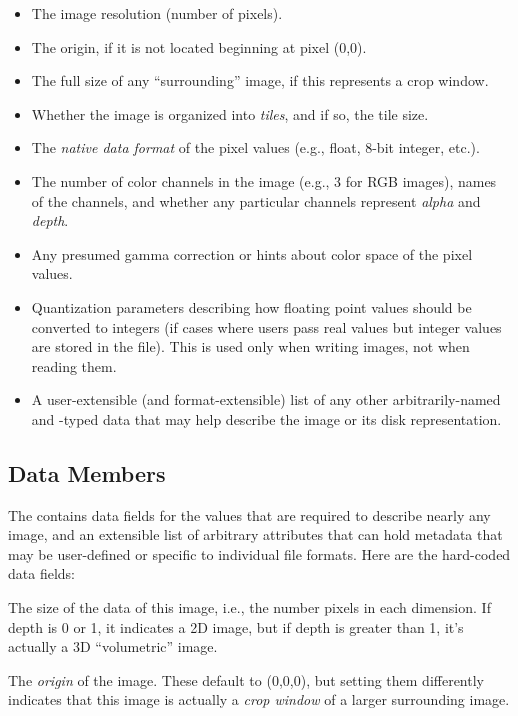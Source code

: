 \begin{itemize}
\item The image resolution (number of pixels).
\item The origin, if it is not located beginning at pixel (0,0).
\item The full size of any ``surrounding'' image, if this represents a crop
  window.
\item Whether the image is organized into \emph{tiles}, and if so, the
  tile size.
\item The \emph{native data format} of the pixel values (e.g., float, 8-bit
  integer, etc.).
\item The number of color channels in the image (e.g., 3 for RGB
  images), names of the channels, and whether any particular channels
  represent \emph{alpha} and \emph{depth}.
\item Any presumed gamma correction or hints about color space of
  the pixel values.
\item Quantization parameters describing how floating point values
  should be converted to integers (if cases where users pass real values
  but integer values are stored in the file).  This is used only when
  writing images, not when reading them.
\item A user-extensible (and format-extensible) list of any other
  arbitrarily-named and -typed data that may help describe the image or
  its disk representation.
\end{itemize}

\subsection{\ImageSpec Data Members}

The \ImageSpec contains data fields for the values that are
required to describe nearly any image, and an extensible list of
arbitrary attributes that can hold metadata that may be user-defined or
specific to individual file formats.  Here are the hard-coded data
fields:

The size of the data of this image, i.e., the number pixels in each
dimension.  If {\cf depth} is 0 or 1, it indicates a 2D image, but if
{\cf depth} is greater than 1, it's actually a 3D ``volumetric'' image.
\apiend

The \emph{origin} of the image.  These default to (0,0,0), but setting
them differently indicates that this image is actually a \emph{crop window}
of a larger surrounding image.
\apiend

